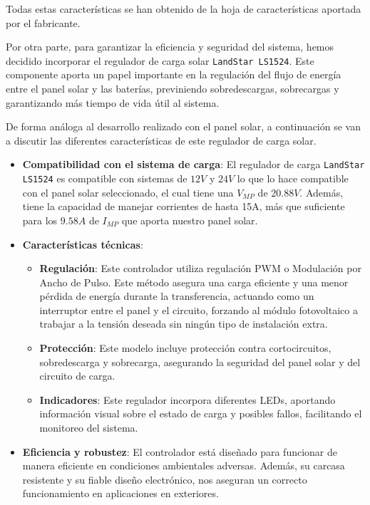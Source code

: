 Todas estas características se han obtenido de la hoja de características aportada por el fabricante.\cite{semperesolutionsPanelSolarMonocristalino}

Por otra parte, para garantizar la eficiencia y seguridad del sistema, hemos decidido incorporar el regulador de carga solar \texttt{LandStar LS1524}. Este componente aporta un papel importante en la regulación del flujo de energía entre el panel solar y las baterías, previniendo sobredescargas, sobrecargas y garantizando más tiempo de vida útil al sistema.

De forma análoga al desarrollo realizado con el panel solar, a continuación se van a discutir las diferentes características de este regulador de carga solar.

\begin{itemize}
    \item \textbf{Compatibilidad con el sistema de carga}: El regulador de carga \texttt{LandStar LS1524} es compatible con sistemas de $12 V$ y $24 V$ lo que lo hace compatible con el panel solar seleccionado, el cual tiene una $V_{MP}$ de $20.88 V$. Además, tiene la capacidad de manejar corrientes de hasta 15A, más que suficiente para los $9.58 A$ de $I_{MP}$ que aporta nuestro panel solar.

    \item \textbf{Características técnicas}:
    \begin{itemize}
        \item \textbf{Regulación}: Este controlador utiliza regulación PWM o Modulación por Ancho de Pulso. Este método asegura una carga eficiente y una menor pérdida de energía durante la transferencia, actuando como un interruptor entre el panel y el circuito, forzando al módulo fotovoltaico a trabajar a la tensión deseada sin ningún tipo de instalación extra.
        \item \textbf{Protección}: Este modelo incluye protección contra cortocircuitos, sobredescarga y sobrecarga, asegurando la seguridad del panel solar y del circuito de carga.
        \item \textbf{Indicadores}: Este regulador incorpora diferentes LEDs, aportando información visual sobre el estado de carga y posibles fallos, facilitando el monitoreo del sistema.
    \end{itemize}

    \item \textbf{Eficiencia y robustez}: El controlador está diseñado para funcionar de manera eficiente en condiciones ambientales adversas. Además, su carcasa resistente y su fiable diseño electrónico, nos aseguran un correcto funcionamiento en aplicaciones en exteriores.


\end{itemize}
